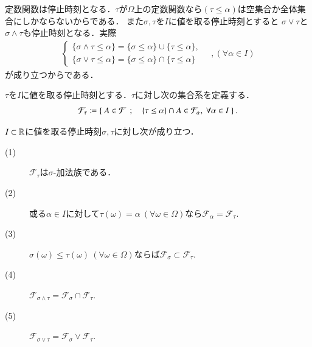 	定数関数は停止時刻となる．$\tau$が$\Omega$上の定数関数なら$(\tau \leq \alpha)$は空集合か全体集合にしかならないからである．
	また$\sigma,\tau$を$I$に値を取る停止時刻とすると
	$\sigma \vee \tau$と$\sigma \wedge \tau$も停止時刻となる．実際
	\begin{align}
		\begin{cases}
			\{ \sigma \wedge \tau \leq \alpha \} = \{ \sigma \leq \alpha \} \cup \{ \tau \leq \alpha \}, \\
			\{ \sigma \vee \tau \leq \alpha \} = \{ \sigma \leq \alpha \} \cap \{ \tau \leq \alpha \}
		\end{cases}
		\quad ,(\forall \alpha \in I)
	\end{align}
	が成り立つからである．
	
	\begin{itembox}[l]{}
		\begin{dfn}[停止時刻の前に決まっている事象系]
			$\tau$を$I$に値を取る停止時刻とする．$\tau$に対し次の集合系を定義する．
			\begin{align}
				\mathcal{F}_\tau \coloneqq \left\{\ A \in \mathcal{F}\ \, ; \quad \{ \tau \leq \alpha \} \cap A \in \mathcal{F}_\alpha,\ \forall \alpha \in I\ \right\}.
			\end{align}
		\end{dfn}
	\end{itembox}
	\begin{itembox}[l]{}
		\begin{prp}[停止時刻の性質]
			$I \subset \mathbb{R}$に値を取る停止時刻$\sigma, \tau$に対し次が成り立つ．
			\begin{description}
				\item[(1)] $\mathcal{F}_\tau$は$\sigma$-加法族である．
				\item[(2)] 或る$\alpha \in I$に対して$\tau(\omega) = \alpha\ (\forall \omega \in \Omega)$なら$\mathcal{F}_\alpha = \mathcal{F}_\tau$.
				\item[(3)] $\sigma(\omega) \leq \tau(\omega)\ (\forall \omega \in \Omega)$ならば$\mathcal{F}_\sigma \subset \mathcal{F}_\tau$.
				\item[(4)] $\mathcal{F}_{\sigma \wedge \tau} = \mathcal{F}_\sigma \cap \mathcal{F}_\tau$.
				\item[(5)] $\mathcal{F}_{\sigma \vee \tau} = \mathcal{F}_\sigma \vee \mathcal{F}_\tau$.
			\end{description}
		\end{prp}
	\end{itembox}
	
